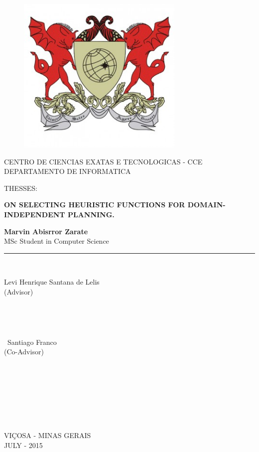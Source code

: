 \documentclass[a4paper,12pt]{article}
\begin{document}
\begin{titlepage}

\begin{center}
\vspace*{-1in}
\begin{figure}[htb]
\begin{center}
\includegraphics[width=8cm]{./image/ufv1}
\end{center}
\end{figure}

CENTRO DE CIENCIAS EXATAS E TECNOLOGICAS - CCE\\
\vspace*{0.15in}
DEPARTAMENTO DE INFORMATICA \\
\vspace*{0.6in}
\begin{large}
THESSES:\\
\end{large}
\vspace*{0.2in}
\begin{Large}
\textbf{ON SELECTING HEURISTIC FUNCTIONS FOR DOMAIN-INDEPENDENT PLANNING.} \\
\end{Large}
\vspace*{0.3in}
\begin{large}
\textbf{Marvin Abisrror Zarate} \\
MSc Student in Computer Science \\
\end{large}
\vspace*{0.3in}
\rule{80mm}{0.1mm}\\
\vspace*{0.1in}
\begin{large}
Levi Henrique Santana de Lelis \\
(Advisor)
\

\

\

\
Santiago Franco \\
(Co-Advisor)
\

\

\

\

\
\end{large}
VIÇOSA - MINAS GERAIS\\
JULY - 2015
\end{center}
\end{titlepage}
\end{document}
